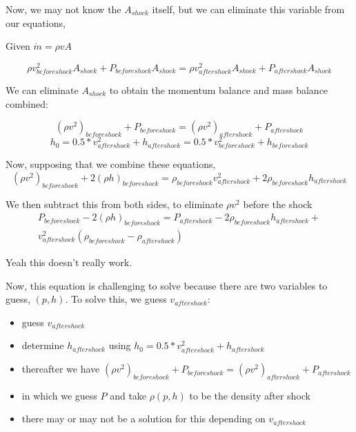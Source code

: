 \documentclass[masters]{ucbthesis}
\renewcommand{\_}{\kern-1.5pt\textunderscore\kern-1.5pt}
\begin{document}
Now, we may not know the $A_{shock}$ itself, but we can eliminate this 
variable from our equations,

Given $\dot{m} = \rho v A$

\begin{equation*}
	\rho v^2_{beforeshock} A_{shock}  + P_{beforeshock} A_{shock} = 
	\rho v^2_{aftershock} A_{shock} + P_{aftershock} A_{shock}
\end{equation*}

We can eliminate $A_{shock}$ to obtain the momentum balance and mass 
balance combined:

\begin{equation*}
	(\rho v^2)_{beforeshock}   + P_{beforeshock}  = 
	(\rho v^2)_{aftershock}  + P_{aftershock} 
\end{equation*}
\begin{equation*}
	h_0 = 0.5 * v_{aftershock}^2 + h_{aftershock}
	= 0.5 * v_{beforeshock}^2 + h_{beforeshock}
\end{equation*}

Now, supposing that we combine these equations,
\begin{equation*}
	(\rho v^2)_{beforeshock} + 2 (\rho h)_{beforeshock} =
	\rho_{beforeshock} v_{aftershock}^2 + 2 \rho_{beforeshock} h_{aftershock}
\end{equation*}

We then subtract this from both sides, to eliminate $\rho v^2$ before the 
shock
\begin{align*}
	P_{beforeshock} - 2 (\rho h)_{beforeshock} =
	P_{aftershock} - 2 \rho_{beforeshock} h_{aftershock} + \\
	v^2_{aftershock} (\rho_{beforeshock} - \rho_{aftershock})
\end{align*}

Yeah this doesn't really work.

Now, this equation is challenging to solve because there are two variables 
to guess, $(p,h)$. To solve this, we guess $v_{aftershock}$:

\begin{itemize}
	\item guess $v_{aftershock}$
	\item determine $h_{aftershock}$ using $h_0 = 0.5 * v_{aftershock}^2 + h_{aftershock}$
	\item thereafter we have $ (\rho v^2)_{beforeshock}   + P_{beforeshock}  = (\rho v^2)_{aftershock}  + P_{aftershock} $
	\item in which we guess $P$ and take $\rho(p,h)$ to be the density after shock
	\item there may or may not be a solution for this depending on $v_{aftershock}$
\end{itemize}
\end{document}
